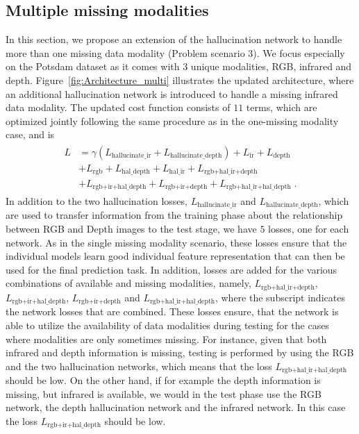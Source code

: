 \documentclass[journal]{IEEEtran}
\begin{document}
\subsection{Multiple missing modalities}
\label{sec:multiple_missing}
In this section, we propose an extension of the hallucination network to handle more than one missing data modality (Problem scenario 3). We focus especially on the Potsdam dataset as it comes with $3$ unique modalities, RGB, infrared and depth. Figure~\ref{fig:Architecture_multi} illustrates the updated architecture, where an additional hallucination network is introduced to handle a missing infrared data modality. The updated cost function consists of $11$ terms, which are optimized jointly following the same procedure as in the one-missing modality case, and is
\begin{align}
\label{lossfunction_multi}
    \begin{split}
    L &= \gamma (L_{\text{hallucinate\_ir}} + L_{\text{hallucinate\_depth}}) + L_{\text{ir}} + L_{\text{depth}} \\
    &+ L_{\text{rgb}} + L_{\text{hal\_depth}} + L_{\text{hal\_ir}} + L_{\text{rgb+hal\_ir+depth}} \\
    &+ L_{\text{rgb+ir+hal\_depth}} + L_{\text{rgb+ir+depth}} + L_{\text{rgb+hal\_ir+hal\_depth}} \;.
\end{split}
\end{align}  
In addition to the two hallucination losses, $L_{\text{hallucinate\_ir}}$ and $L_{\text{hallucinate\_depth}}$, which are used to transfer information from the training phase about the relationship between RGB and Depth images to the test stage, we have $5$ losses, one for each network. As in the single missing modality scenario, these losses ensure that the individual models learn good individual feature representation that can then be used for the final prediction task. In addition, losses are added for the various combinations of available and missing modalities, namely, $L_{\text{rgb+hal\_ir+depth}}$, $L_{\text{rgb+ir+hal\_depth}}$, $L_{\text{rgb+ir+depth}}$ and $L_{\text{rgb+hal\_ir+hal\_depth}}$, where the subscript indicates the network losses that are combined. These losses ensure, that the network is able to utilize the availability of data modalities during testing for the cases where modalities are only sometimes missing. For instance, given that both infrared and depth information is missing, testing is performed by using the RGB and the two hallucination networks, which means that the loss $L_{\text{rgb+hal\_ir+hal\_depth}}$ should be low. On the other hand, if for example the depth information is missing, but infrared is available, we would in the test phase use the RGB network, the depth hallucination network and the infrared network. In this case the loss $L_{\text{rgb+ir+hal\_depth}}$ should be low.
\end{document}
